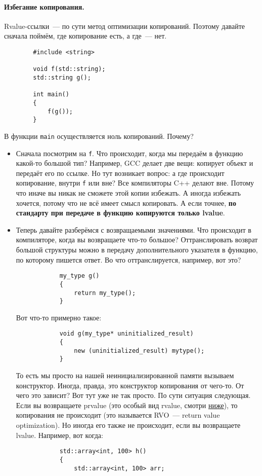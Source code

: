 \documentclass{article}
\begin{document}
    \paragraph{Избегание копирования.}
    Rvalue-ссылки~--- по сути метод оптимизации копирований. Поэтому давайте сначала поймём, где копирование есть, а где~--- нет.
    \begin{verbatim}
        #include <string>

        void f(std::string);
        std::string g();

        int main()
        {
            f(g());
        }
    \end{verbatim}
    В функции \texttt{main} осуществляется ноль копирований. Почему?
    \begin{itemize}
        \item Сначала посмотрим на \texttt{f}. Что происходит, когда мы передаём в функцию какой-то большой тип? Например, GCC делает две вещи: копирует объект и передаёт его по ссылке. Но тут возникает вопрос: а где происходит копирование, внутри \texttt{f} или вне? Все компиляторы C++ делают вне. Потому что иначе вы никак не сможете этой копии избежать. А иногда избежать хочется, потому что не всё имеет смысл копировать. А если точнее, \textbf{по стандарту при передаче в функцию копируются только lvalue}.
        \item Теперь давайте разберёмся с возвращаемыми значениями. Что происходит в компиляторе, когда вы возвращаете что-то большое? Оттранслировать возврат большой структуры можно в передачу дополнительного указателя в функцию, по которому пишется ответ. Во что оттранслируется, например, вот это?
        \begin{verbatim}
            my_type g()
            {
                return my_type();
            }
        \end{verbatim}
        Вот что-то примерно такое:
        \begin{verbatim}
            void g(my_type* uninitialized_result)
            {
                new (uninitialized_result) mytype();
            }
        \end{verbatim}
        То есть мы просто на нашей неинициализированной памяти вызываем конструктор. Иногда, правда, это конструктор копирования от чего-то. От чего это зависит? Вот тут уже не так просто. По сути ситуация следующая. Если вы возвращаете prvalue (это особый вид rvalue, смотри \hyperref[par:xvalue]{ниже}), то копирования не происходит (это называется RVO~--- return value optimization). Но иногда его также не происходит, если вы возвращаете lvalue. Например, вот когда:
        \begin{verbatim}
            std::array<int, 100> h()
            {
                std::array<int, 100> arr;


\end{verbatim}
\end{itemize}
\end{document}

